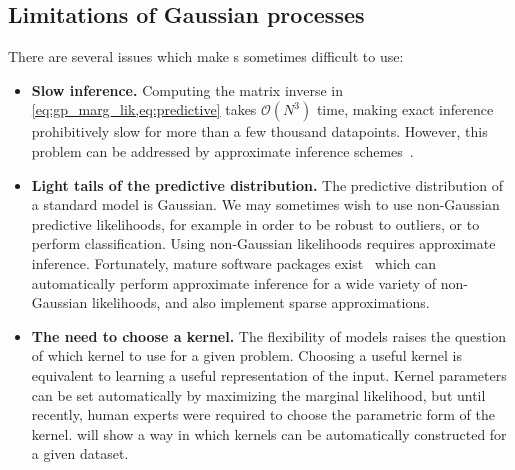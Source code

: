 \subsection{Limitations of Gaussian processes}

There are several issues which make \gp{}s sometimes difficult to use:

\begin{itemize}

\item {\bf Slow inference.}
Computing the matrix inverse in \cref{eq:gp_marg_lik,eq:predictive} takes $\mathcal{O}(N^3)$ time, making exact inference prohibitively slow for more than a few thousand datapoints.
However, this problem can be addressed by approximate inference schemes~\citep{snelson2006sparse, quinonero2005unifying, hensman2013gaussian}. 

\item {\bf Light tails of the predictive distribution.}
The predictive distribution of a standard \gp{} model is Gaussian.
We may sometimes wish to use non-Gaussian predictive likelihoods, for example in order to be robust to outliers, or to perform classification.
Using non-Gaussian likelihoods requires approximate inference.
Fortunately, mature software packages exist~\citep{GPy, GPML, VanRiiHarJylVeh14} which can automatically perform approximate inference for a wide variety of non-Gaussian likelihoods, and also implement sparse approximations.

\item {\bf The need to choose a kernel.}
The flexibility of \gp{} models raises the question of which kernel to use for a given problem.
Choosing a useful kernel is equivalent to learning a useful representation of the input.
Kernel parameters can be set automatically by maximizing the marginal likelihood, but until recently, human experts were required to choose the parametric form of the kernel. %
 will show a way in which kernels can be automatically constructed for a given dataset.
\end{itemize}





